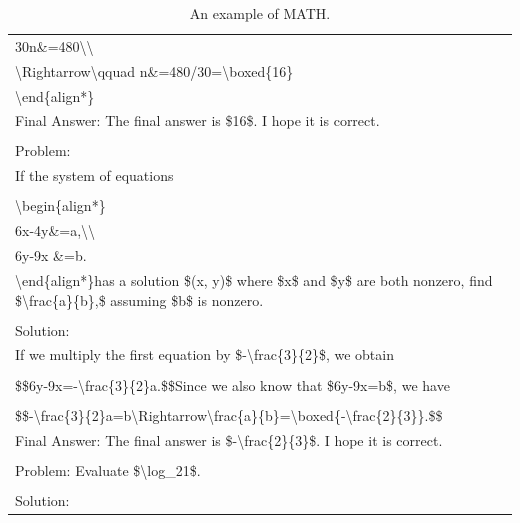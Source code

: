 \begin{table}[h]
\begin{tabular}{p{12cm}}
\\30n\&=480\textbackslash \textbackslash 
\\\textbackslash Rightarrow\textbackslash qquad n\&=480/30=\textbackslash boxed\{16\}
\\\textbackslash end\{align*\}
\\Final Answer: The final answer is \$16\$. I hope it is correct.
\\
\\Problem:
\\If the system of equations
\\
\\\textbackslash begin\{align*\}
\\6x-4y\&=a,\textbackslash \textbackslash 
\\6y-9x \&=b.
\\\textbackslash end\{align*\}has a solution \$(x, y)\$ where \$x\$ and \$y\$ are both nonzero, find \$\textbackslash frac\{a\}\{b\},\$ assuming \$b\$ is nonzero.
\\
\\Solution:
\\If we multiply the first equation by \$-\textbackslash frac\{3\}\{2\}\$, we obtain
\\
\\\$\$6y-9x=-\textbackslash frac\{3\}\{2\}a.\$\$Since we also know that \$6y-9x=b\$, we have
\\
\\\$\$-\textbackslash frac\{3\}\{2\}a=b\textbackslash Rightarrow\textbackslash frac\{a\}\{b\}=\textbackslash boxed\{-\textbackslash frac\{2\}\{3\}\}.\$\$
\\Final Answer: The final answer is \$-\textbackslash frac\{2\}\{3\}\$. I hope it is correct.\\
\\
Problem: Evaluate \$\textbackslash log\_21\$.\\
\\
Solution:\\
\bottomrule
\end{tabular}
    \caption{\centering An example of MATH.}
    \label{tab:math_eval_format_example}
\end{table}



